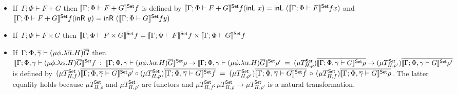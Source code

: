 \documentclass[runningheads]{llncs}
\newcommand{\set}{\mathsf{Set}}
\newcommand{\inl}{\mathsf{inL}\,}
\newcommand{\inr}{\mathsf{inR}\,}
\begin{document}
\begin{definition}
\begin{itemize}
\item If\, $\Gamma;\Phi \vdash F + G$ then $\setsem{\Gamma;\Phi
  \vdash F + G}f$ is defined by $\setsem{\Gamma;\Phi \vdash
  F + G}f(\inl\,x) = \inl\,(\setsem{\Gamma;\Phi \vdash
  F}f x)$ and $\setsem{\Gamma;\Phi \vdash F +
  G}f(\inr\,y) = \inr\,(\setsem{\Gamma;\Phi \vdash G}f y)$
\item If \,$\Gamma;\Phi\vdash F \times G$ then
  $\setsem{\Gamma;\Phi \vdash F \times G}f = 
  \setsem{\Gamma;\Phi \vdash F}f \times \setsem{\Gamma;\Phi \vdash
    G}f$
\item If \,$\Gamma;\Phi,\overline{\gamma} \vdash (\mu \phi.\lambda
  \overline{\alpha}. H)\overline{G}$ then
$\setsem{\Gamma;\Phi,\ol\gamma \vdash (\mu  \phi.\lambda
    \ol{\alpha}. H)\ol{G}} f \;: \;\setsem{\Gamma;\Phi,\ol\gamma 
    \vdash (\mu \phi.\lambda \ol{\alpha}. H)\ol{G}} \rho \to
  \setsem{\Gamma;\Phi,\ol\gamma \vdash (\mu
    \phi.\lambda\ol{\alpha}. H)\ol{G}} \rho'
  \;= \;(\mu
  T^\set_{H,\rho})\ol{\setsem{\Gamma;\Phi,\ol\gamma \vdash G}\rho} \to (\mu
  T^\set_{H,\rho'})\ol{\setsem{\Gamma;\Phi,\ol\gamma \vdash G}\rho'}$
  is
  defined by
 $(\mu T^\set_{H,f})\ol{\setsem{\Gamma;\Phi,\ol\gamma \vdash
      G}\rho'} \circ (\mu T^\set_{H,\rho})\ol{\setsem{\Gamma;\Phi,\ol\gamma
      \vdash G}f}\; = \; (\mu T^\set_{H,\rho'})\ol{\setsem{\Gamma;\Phi,\ol\gamma
      \vdash G}f}\, \circ\, (\mu T^\set_{H,f})\ol{\setsem{\Gamma;\Phi,\ol\gamma
      \vdash G}\rho}$.
  The latter equality holds because $\mu
  T^\set_{H,\rho}$ and $\mu T^\set_{H,\rho'}$ are functors and $\mu
  T_{H,f}^\set : \mu T_{H,\rho}^\set \to \mu T_{H,\rho'}^\set$ is a
  natural transformation.

\end{itemize}
\end{definition}
\end{document}
